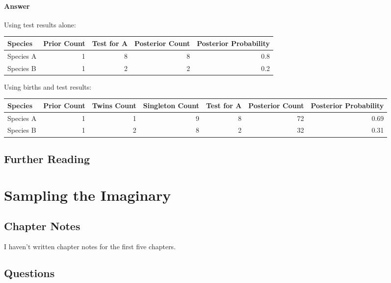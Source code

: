 \documentclass[
]{book}
\begin{document}
\hypertarget{answer-14}{%
\subsubsection*{Answer}\label{answer-14}}

Using test results alone:

\begin{tabular}{l|r|r|r|r}
\hline
Species & Prior Count & Test for A & Posterior Count & Posterior Probability\\
\hline
Species A & 1 & 8 & 8 & 0.8\\
\hline
Species B & 1 & 2 & 2 & 0.2\\
\hline
\end{tabular}

Using births and test results:

\begin{tabular}{l|r|r|r|r|r|r}
\hline
Species & Prior Count & Twins Count & Singleton Count & Test for A & Posterior Count & Posterior Probability\\
\hline
Species A & 1 & 1 & 9 & 8 & 72 & 0.69\\
\hline
Species B & 1 & 2 & 8 & 2 & 32 & 0.31\\
\hline
\end{tabular}

\hypertarget{further-reading-1}{%
\section*{Further Reading}\label{further-reading-1}}

\hypertarget{sampling_imaginary}{%
\chapter{Sampling the Imaginary}\label{sampling_imaginary}}

\hypertarget{chapter-notes-2}{%
\section{Chapter Notes}\label{chapter-notes-2}}

I haven't written chapter notes for the first five chapters.

\hypertarget{questions-2}{%
\section{Questions}\label{questions-2}}
\end{document}
